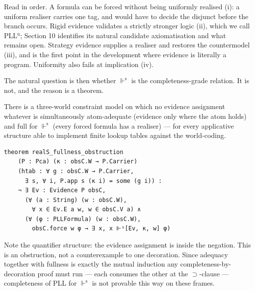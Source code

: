 Read in order. A formula can be forced without being uniformly realised
(i): a uniform realiser carries one tag, and would have to decide the
disjunct before the branch occurs. Rigid evidence validates a strictly
stronger logic (ii), which we call PLL\ensuremath{{}^{\mathrm{u}}};
Section 10 identifies its natural candidate axiomatisation and what
remains open. Strategy evidence supplies a realiser and restores the
countermodel (iii), and is the first point in the development where
evidence is literally a program. Uniformity also fails at implication (iv).

The natural question is then whether \ensuremath{\Vdash^{\mathrm{s}}} is the completeness-grade
relation. It is not, and the reason is a theorem.

\begin{theorem}\label{thm:obstruction}
There is a three-world constraint model on
which no evidence assignment whatever is simultaneously atom-adequate
(evidence only where the atom holds) and full for \ensuremath{\Vdash^{\mathrm{s}}} (every forced
formula has a realiser) --- for every applicative structure able to
implement finite lookup tables against the world-coding.
\end{theorem}

\begin{lstlisting}
theorem realS_fullness_obstruction
    (P : Pca) (κ : obsC.W → P.Carrier)
    (htab : ∀ g : obsC.W → P.Carrier,
      ∃ s, ∀ i, P.app s (κ i) = some (g i)) :
    ¬ ∃ Ev : Evidence P obsC,
      (∀ (a : String) (w : obsC.W),
        ∀ x ∈ Ev.E a w, w ∈ obsC.V a) ∧
      (∀ (φ : PLLFormula) (w : obsC.W),
        obsC.force w φ → ∃ x, x ⊩ˢ[Ev, κ, w] φ)
\end{lstlisting}

Note the quantifier structure: the evidence assignment is inside the
negation. This is an obstruction, not a counterexample to one
decoration. Since adequacy together with fullness is exactly the mutual
induction any completeness-by-decoration proof must run --- each consumes
the other at the \ensuremath{\supset}-clause --- completeness of PLL for \ensuremath{\Vdash^{\mathrm{s}}} is not provable
this way on these frames.

